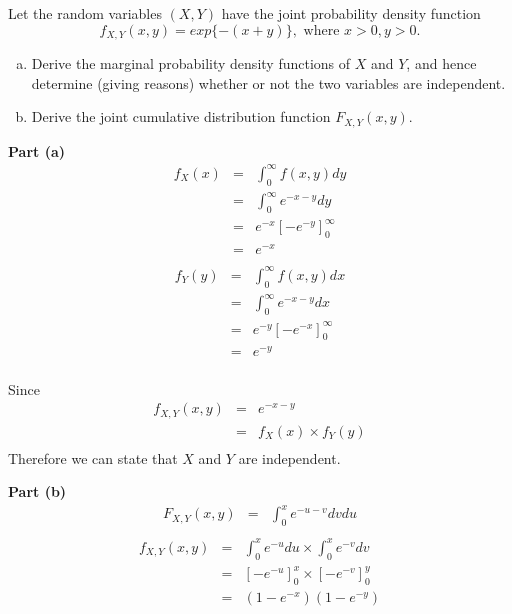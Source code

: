 \documentclass[a4paper,12pt]{article}
\begin{document}
	
	\large
	\noindent Let the random variables $(X,Y)$ have the joint probability density function
	\[f_{X , Y} ( x , y ) = exp\{- ( x + y )\}, \mbox{ where } x > 0, y > 0.\]
	\begin{enumerate}[(a)]
		\item Derive the marginal probability density functions of $X$ and $Y$, and hence determine (giving reasons) whether or not the two variables are independent.
		\item Derive the joint cumulative distribution function $F_{X , Y} ( x , y )$.
	\end{enumerate}
	\medskip
	\large
	\noindent \textbf{Part (a)}\\
	
	\begin{eqnarray*}
		f_{X} ( x )  &=& \int^{\infty}_{0}f ( x , y ) dy\\
		&=& \int^{\infty}_{0}e^{-x-y} dy\\
		&=& e^{-x} \left[ -e^{-y} \right]^{\infty}_{0}\\
		&=& e^{-x}\\
	\end{eqnarray*}
	\begin{eqnarray*}
		f_{Y} ( y )
		&=& \int^{\infty}_{0}f ( x , y ) dx\\
		&=& \int^{\infty}_{0}e^{-x-y} dx\\
		&=& e^{-y} \left[ -e^{-x} \right]^{\infty}_{0}\\
		&=& e^{-y}\\
	\end{eqnarray*}
	
	
	Since 
	\begin{eqnarray*}
		f_{X , Y} ( x , y ) &=& e^{-x-y} \\
		&=&  f_{X} ( x ) \times f_{Y} ( y )\\
	\end{eqnarray*}
	Therefore we can state that $X$ and $Y$ are independent.
	
	
	\newpage
	\large
	\noindent \textbf{Part (b)}\\
	
	\begin{eqnarray*}
		F_{X , Y} ( x , y )
		&=& \int^{x}_{0}e^{-u-v} dv du\\
	\end{eqnarray*}
	\begin{eqnarray*}
		f_{X , Y} ( x , y )
		&=& \int^{x}_{0}e^{-u} du\times \int^{x}_{0}e^{-v} dv \\
		&=& \left[ -e^{-u} \right]^{x}_{0} \times \left[ -e^{-v} \right]^{y}_{0} \\
		&=& ( 1 -e^{-x} ) ( 1 -e^{-y} )\\
	\end{eqnarray*}
	
\end{document}
